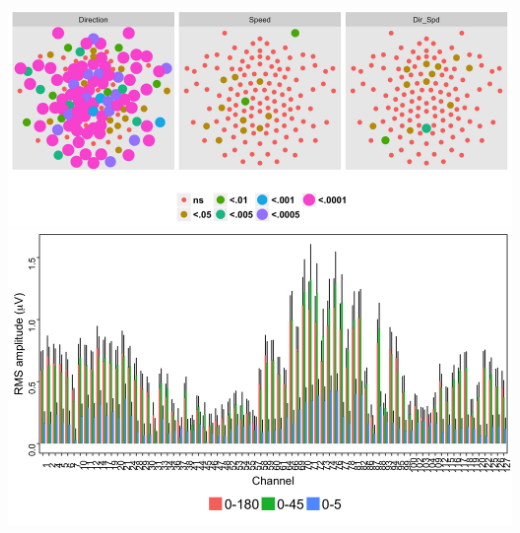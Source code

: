 \documentclass[landscape,final,paperwidth=72in,paperheight=40.5in,fontscale=0.285]{baposter}
\begin{document}
\begin{poster}
{\begin{center}
\end{center}

}
{

\begin{center}

  \includegraphics[scale=0.25,valign=t]{../../figs/2F1-analyze-and-plot-main-effects-1.png}
  \hfill
  \includegraphics[scale=0.18,valign=t]{../../figs/2F1-plot-channel-effects-1.png}
  \hfill

\end{center}}
\end{poster}
\end{document}
